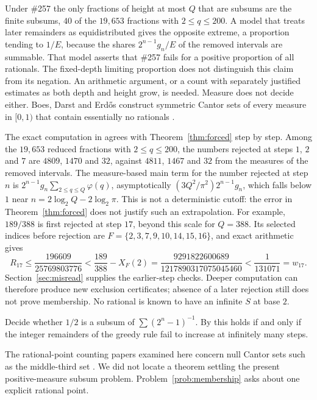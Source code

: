 \documentclass[11pt]{article}
\begin{document}
Under \#257 the only fractions of height at most $Q$ that are subsums are the
finite subsums, $40$ of the $19{,}653$ fractions with $2\le q\le200$.  A model
that treats later remainders as equidistributed gives the opposite extreme, a
proportion tending to $1/E$, because the shares $2^{n-1}g_n/E$ of the removed
intervals are summable.  That model asserts that \#257 fails for a
positive proportion of all rationals.  The fixed-depth limiting proportion does
not distinguish this claim from its negation.  An arithmetic argument, or a
count with separately justified estimates as both depth and height grow, is needed.
Measure does not decide either.  Boes, Darst and Erd\H{o}s construct symmetric
Cantor sets of every measure in $[0,1)$ that contain essentially no rationals
\cite{boesdarsterdos1981}.

The exact computation in \cite{plectisinvestigation} agrees with
Theorem~\ref{thm:forced} step by step.  Among the $19{,}653$ reduced fractions
with $2\le q\le200$, the numbers rejected at steps $1$, $2$ and $7$ are $4809$,
$1470$ and $32$, against $4811$, $1467$ and $32$ from the measures of the
removed intervals.  The measure-based main term for the number rejected at step $n$ is
$2^{n-1}g_n\sum_{2\le q\le Q}\varphi(q)$, asymptotically $(3Q^2/\pi^2)2^{n-1}g_n$,
which falls below $1$ near $n=2\log_2Q-2\log_2\pi$.  This is not a
deterministic cutoff: the error in Theorem~\ref{thm:forced} does not justify
such an extrapolation.  For example, $189/388$ is first rejected at step $17$,
beyond this scale for $Q=388$.  Its selected indices before rejection are
$F=\{2,3,7,9,10,14,15,16\}$, and exact arithmetic gives
\[
 R_{17}\le\frac{196609}{25769803776}
 <\frac{189}{388}-X_F(2)
 =\frac{9291822600689}{1217890317075045460}
 <\frac1{131071}=w_{17}.
\]
Section~\ref{sec:misread} supplies the earlier-step checks.  Deeper computation can
therefore produce new exclusion certificates; absence of a later rejection
still does not prove membership.  No rational is known to have an infinite
$S$ at base $2$.

\begin{problem}\label{prob:membership}
Decide whether $1/2$ is a subsum of $\sum(2^n-1)^{-1}$.  By
\cite[Theorem~7]{plectis257} this holds if and only if the integer remainders
of the greedy rule fail to increase at infinitely many steps.
\end{problem}

The rational-point counting papers examined here concern null Cantor sets
such as the middle-third set \cite{rstw2019,chowvarjuyu2024}.  We did not locate
a theorem settling the present positive-measure subsum problem.
Problem~\ref{prob:membership} asks about one explicit rational point.
\end{document}
